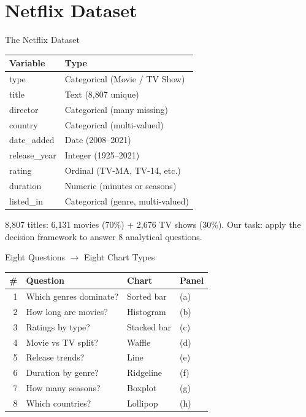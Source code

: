 \documentclass[10pt]{beamer}
\begin{document}
\section{Netflix Dataset}

\begin{frame}{The Netflix Dataset}
  \centering
  \begin{tabular}{ll}
    \toprule
    \textbf{Variable} & \textbf{Type} \\
    \midrule
    type & Categorical (Movie / TV Show) \\
    title & Text (8,807 unique) \\
    director & Categorical (many missing) \\
    country & Categorical (multi-valued) \\
    date\_added & Date (2008--2021) \\
    release\_year & Integer (1925--2021) \\
    rating & Ordinal (TV-MA, TV-14, etc.) \\
    duration & Numeric (minutes or seasons) \\
    listed\_in & Categorical (genre, multi-valued) \\
    \bottomrule
  \end{tabular}

  \vspace{6pt}
  {\small 8,807 titles: 6,131 movies (70\%) + 2,676 TV shows (30\%).
  Our task: apply the decision framework to answer 8 analytical questions.}
\end{frame}

\begin{frame}{Eight Questions $\rightarrow$ Eight Chart Types}
  \centering
  {\small
  \begin{tabular}{rlll}
    \toprule
    \textbf{\#} & \textbf{Question} & \textbf{Chart} & \textbf{Panel} \\
    \midrule
    1 & Which genres dominate? & Sorted bar & (a) \\
    2 & How long are movies? & Histogram & (b) \\
    3 & Ratings by type? & Stacked bar & (c) \\
    4 & Movie vs TV split? & Waffle & (d) \\
    5 & Release trends? & Line & (e) \\
    6 & Duration by genre? & Ridgeline & (f) \\
    7 & How many seasons? & Boxplot & (g) \\
    8 & Which countries? & Lollipop & (h) \\
    \bottomrule
  \end{tabular}}
\end{frame}
\end{document}
